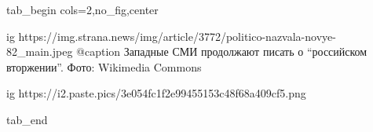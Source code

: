  
 
 
 
 

\ifcmt
  tab_begin cols=2,no_fig,center

  ig https://img.strana.news/img/article/3772/politico-nazvala-novye-82_main.jpeg
  @caption Западные СМИ продолжают писать о \enquote{российском вторжении}. Фото: Wikimedia Commons 

  ig https://i2.paste.pics/3e054fc1f2e99455153c48f68a409cf5.png

  tab_end
\fi
